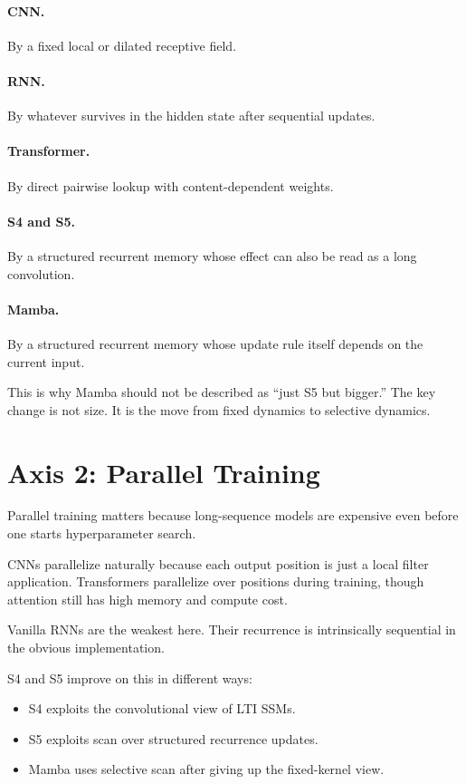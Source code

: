 \paragraph{CNN.}
By a fixed local or dilated receptive field.

\paragraph{RNN.}
By whatever survives in the hidden state after sequential updates.

\paragraph{Transformer.}
By direct pairwise lookup with content-dependent weights.

\paragraph{S4 and S5.}
By a structured recurrent memory whose effect can also be read as a long convolution.

\paragraph{Mamba.}
By a structured recurrent memory whose update rule itself depends on the current input.

This is why Mamba should not be described as ``just S5 but bigger.'' The key change is not
size. It is the move from fixed dynamics to selective dynamics.

\section{Axis 2: Parallel Training}

Parallel training matters because long-sequence models are expensive even before one starts
hyperparameter search.

CNNs parallelize naturally because each output position is just a local filter application.
Transformers parallelize over positions during training, though attention still has high
memory and compute cost.

Vanilla RNNs are the weakest here. Their recurrence is intrinsically sequential in the
obvious implementation.

S4 and S5 improve on this in different ways:

\begin{itemize}
  \item S4 exploits the convolutional view of LTI SSMs.
  \item S5 exploits scan over structured recurrence updates.
  \item Mamba uses selective scan after giving up the fixed-kernel view.
\end{itemize}

